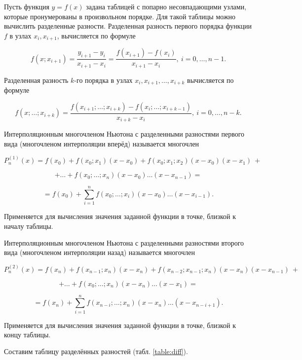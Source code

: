 Пусть функция $y=f(x)$ задана таблицей с попарно несовпадающими узлами, которые пронумерованы в произвольном порядке. Для такой таблицы можно вычислить разделенные разности. Разделенная разность первого порядка функции $f$ в узлах $x_i, x_{i+1}$, вычисляется по формуле

\[
f(x;x_{i+1}) = \frac{y_{i+1}-y_i}{x_{i+1}-x_i} = \frac{f(x_{i+1})-f(x_i)}{x_{i+1}-x_i},~i = 0, \dots, n-1.
\]

Разделенная разность $k$-го порядка в узлах $x_i, x_{i+1}, \dots, x_{i+k}$ вычисляется по формуле

\[
f(x;\dots;x_{i+k}) = \frac{f(x_{i+1}; \dots; x_{i+k})-f(x_i; \dots; x_{i+k-1})}{x_{i+k}-x_i},~i = 0, \dots, n-k.
\]

Интерполяционным многочленом Ньютона с разделенными разностями первого вида (многочленом интерполяции вперёд) называется многочлен

\[
P_n^{(1)}(x) = f(x_0) + f(x_0;x_1)(x - x_0) + f(x_0;x_1;x_2)(x - x_0)(x - x_1)~+
\]

\[
+ \dots + f(x_0;\dots;x_n)(x - x_0)\dots(x - x_{n-1}) =
\]

\[
= f(x_0) + \sum_{i=1}^n f(x_0;\dots;x_i)(x - x_0)\dots(x - x_{i-1}).
\]

Применяется для вычисления значения заданной функции в точке, близкой к началу таблицы.

Интерполяционным многочленом Ньютона с разделенными разностями второго вида (многочленом интерполяции назад) называется многочлен

\[
P_n^{(2)}(x) = f(x_n) + f(x_{n-1};x_n)(x - x_n) + f (x_{n-2};x_{n-1};x_n)(x - x_n)(x - x_{n-1})~+
\]

\[
+ \dots + f(x_0;\dots;x_n)(x - x_n)\dots(x - x_1) =
\]

\[
= f(x_n) + \sum_{i=1}^n f(x_{n-i};\dots;x_n)(x - x_n)\dots(x - x_{n-i+1}).
\]

Применяется для вычисления значения заданной функции в точке, близкой к концу таблицы.

Составим таблицу разделённых разностей (табл. \ref{table:diff}).

